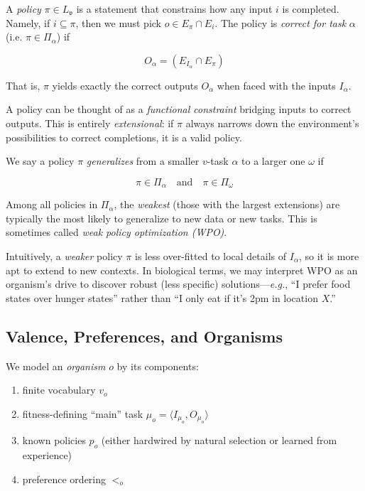 \documentclass[12pt]{article}
\begin{document}
\begin{definition}
A \textit{policy} $\pi \in L_{\mathfrak{v}}$ is a statement that constrains how any input $i$ is completed. Namely, if $i \subseteq \pi$, then we must pick $o \in E_{\pi} \cap E_i$. 
The policy is \textit{correct for task} $\alpha$ (i.e. $\pi \in \Pi_\alpha$) if

\[
   O_\alpha = (E_{I_\alpha} \cap E_\pi)
\]

That is, $\pi$ yields exactly the correct outputs $O_\alpha$ when faced with the inputs $I_\alpha$.
\end{definition}

A policy can be thought of as a \textit{functional constraint} bridging inputs to correct outputs. This is entirely \textit{extensional}: if $\pi$ always narrows down the environment's possibilities to correct completions, it is a valid policy.

\begin{definition}
We say a policy $\pi$ \textit{generalizes} from a smaller $v$-task $\alpha$ to a larger one $\omega$ if 

\[
   \pi \in \Pi_\alpha \quad\text{and}\quad \pi \in \Pi_\omega
\]

Among all policies in $\Pi_\alpha$, the \textit{weakest} (those with the largest extensions) are typically the most likely to generalize to new data or new tasks. This is sometimes called \textit{weak policy optimization (WPO)}.
\end{definition}

Intuitively, a \textit{weaker} policy $\pi$ is less over-fitted to local details of $I_\alpha$, so it is more apt to extend to new contexts. In biological terms, we may interpret WPO as an organism's drive to discover robust (less specific) solutions---\textit{e.g.}, ``I prefer food states over hunger states'' rather than ``I only eat if it's 2pm in location $X$.''

\subsection{Valence, Preferences, and Organisms}

We model an \textit{organism} $o$ by its components:
\begin{enumerate}
\item finite vocabulary $v_o$
\item fitness-defining ``main'' task $\mu_o = \langle I_{\mu_o}, O_{\mu_o} \rangle$
\item known policies $p_o$ (either hardwired by natural selection or learned from experience)
\item preference ordering $<_o$
\end{enumerate}
\end{document}

